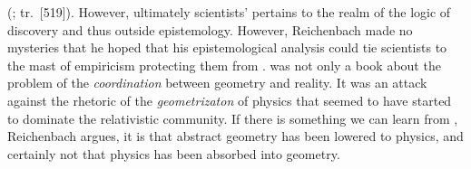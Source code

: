 \documentclass[draft]{article}
\newcommand{\PRZL}{\citetitle{Reichenbach1928}\xspace}
\renewcommand{\rzlap}[2]{(\cite[#1]{Reichenbach1928}; tr.\ [#2])\xspace}
\begin{document}
 \rzlap{372}{519}. However, ultimately scientists'  pertains to the realm of the logic of discovery and thus outside epistemology. However, Reichenbach made no mysteries that he hoped that his epistemological analysis could tie scientists to the mast of empiricism protecting them from  \citep[373]{Reichenbach1928}. \PRZL was not only a book about the problem of the \emph{coordination} between geometry and reality. It was an attack against the rhetoric of the \emph{geometrizaton} of physics that seemed to have started to dominate the relativistic community. If there is something we can learn from \gr, Reichenbach argues, it is that abstract geometry has been lowered to physics, and certainly not that physics has been absorbed into geometry. 
\end{document}

